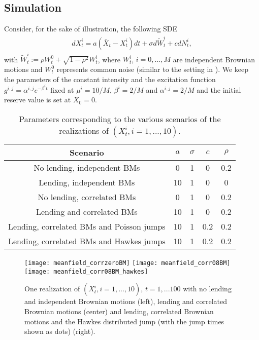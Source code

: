 \documentclass[10pt]{article}
\theoremstyle{plain}
\theoremstyle{definition}
\newcommand{\<}{\langle}
\renewcommand{\>}{\rangle}
\renewcommand{\(}{\left(}
\renewcommand{\)}{\right)}
\renewcommand{\[}{\left[}
\renewcommand{\]}{\right]}
\begin{document}
\subsection{Simulation}
Consider, for the sake of illustration, the following SDE
\begin{align}
dX^i_t = a(\bar X_t-X^i_t)dt + \sigma d\tilde W_t^i + c dN^i_t,
\end{align}
with $\tilde W_t^i := \rho W_t^0 + \sqrt{1-\rho^2}W_t^i$, where $W_t^i$, $i=0,...,M$ are
independent Brownian motions and $W_t^0$ represents common noise (similar to the setting in \citet{carmona13}). We keep the parameters of the constant intensity and the excitation function
$g^{i,j}=\alpha^{i,j}e^{-\beta^i t}$ fixed at $\mu^i = 10/M$, $\beta^{i}=2/M$ and
$\alpha^{i,j}=2/M$ and the initial reserve value is set at $X_0=0$.

\begin{table}[H]
\caption{Parameters corresponding to the various scenarios of the realizations of $(X_t^i, i=1,...,10)$.}\label{tabpar}
\begin{center}
\begin{tabular}{c||c|c|c|c}
Scenario&$a$&$\sigma$&$c$&$\rho$\\\hline\hline\vspace{-0.1cm}
No lending, independent BMs &0&1&0&0.2\\\vspace{-0.1cm}
Lending, independent BMs&10&1&0&0\\\vspace{-0.1cm}
No lending, correlated BMs&0&1&0&0.2\\\vspace{-0.1cm}
Lending and correlated BMs&10&1&0&0.2\\\vspace{-0.1cm}
Lending, correlated BMs and Poisson jumps & 10&1&0.2&0.2\\\vspace{-0.1cm}
Lending, correlated BMs and Hawkes jumps &10&1&0.2&0.2
\end{tabular}
\end{center}
\end{table}
\vspace{-1cm}

\begin{figure}[H]
\begin{center}
  \caption{One realization of $(X_t^i, i=1,...,10)$, $t=1,...100$ with no lending and independent Brownian motions (left), lending and correlated Brownian motions (center) and lending, correlated Brownian motions and the Hawkes distributed jump (with the jump times shown as dots) (right).}\label{fig0}
    \texttt{[image: meanfield\_corrzeroBM]}
    \texttt{[image: meanfield\_corr08BM]}
    \texttt{[image: meanfield\_corr08BM\_hawkes]}
    \end{center}
\end{figure}
\end{document}

